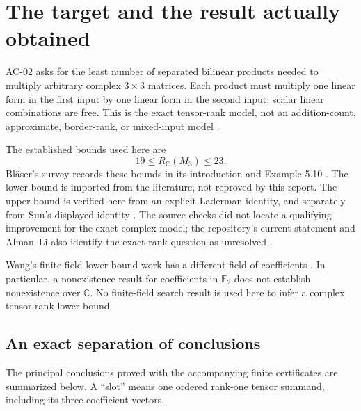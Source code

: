 \documentclass[11pt,letterpaper]{article}
\theoremstyle{definition}\newtheorem{definition}[theorem]{Definition}
\theoremstyle{remark}\newtheorem{remark}[theorem]{Remark}
\newcommand{\CC}{\mathbb C}\newcommand{\ZZ}{\mathbb Z}\newcommand{\QQ}{\mathbb Q}
\begin{document}
\section{The target and the result actually obtained}
\label{sec:scope}
AC-02 asks for the least number of separated bilinear products needed to
multiply arbitrary complex $3\times3$ matrices. Each product must multiply
one linear form in the first input by one linear form in the second input;
scalar linear combinations are free. This is the exact tensor-rank model,
not an addition-count, approximate, border-rank, or mixed-input model
\cite{ac02}.

The established bounds used here are
\begin{equation}\label{eq:interval}
19\le R_{\CC}(M_3)\le23.
\end{equation}
Bl\"aser's survey records these bounds in its introduction and Example 5.10
\cite{blaser}. The lower bound is imported from the literature, not reproved
by this report. The upper bound is verified here from an explicit Laderman
identity, and separately from Sun's displayed identity \cite{laderman,sun}.
The source checks did not locate a qualifying improvement for the exact
complex model; the repository's current statement and Alman--Li also
identify the exact-rank question as unresolved \cite{ac02,almanli}.

Wang's finite-field lower-bound work has a different field of coefficients
\cite{wang}. In particular, a nonexistence result for coefficients in
$\mathbb F_2$ does not establish nonexistence over $\CC$. No finite-field
search result is used here to infer a complex tensor-rank lower bound.

\subsection{An exact separation of conclusions}
The principal conclusions proved with the accompanying finite certificates
are summarized below. A ``slot'' means one ordered rank-one tensor summand,
including its three coefficient vectors.
\end{document}
